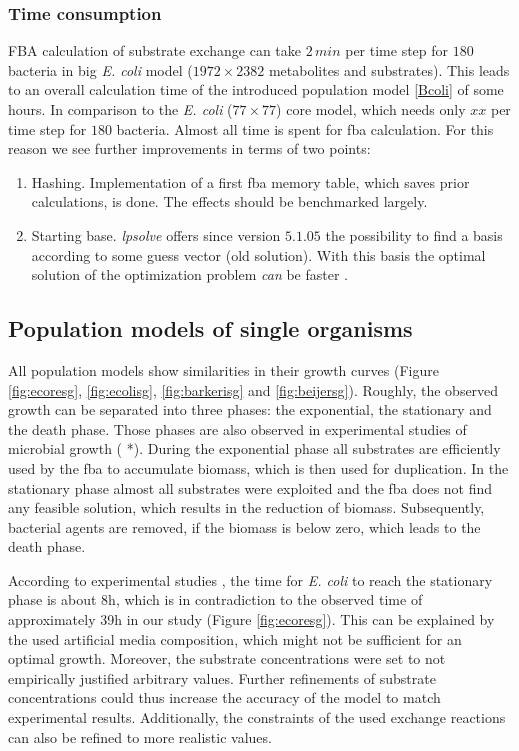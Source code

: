 \subsubsection{Time consumption}
FBA calculation of substrate exchange can take $2\,min$ per time step for $180$ bacteria in big \textit{E. coli} model ($1972\times 2382$ metabolites and substrates).
This leads to an overall calculation time of the introduced population model \ref{Bcoli} of some hours.
In comparison to the \textit{E. coli} ($77\times 77$) core model, which needs only $xx$ per time step for $180$ bacteria.
Almost all time is spent for fba calculation.
For this reason we see further improvements in terms of two points:
\begin{enumerate}
  \item Hashing. Implementation of a first fba memory table, which saves prior calculations, is done.
    The effects should be benchmarked largely.
  \item Starting base. \textit{lpsolve} offers since version $5.1.05$ the possibility to find a basis according to some guess vector (old solution).
    With this basis the optimal solution of the optimization problem \textit{can} be faster \cite{warmstart}.
\end{enumerate}

\subsection{Population models of single organisms}
All population models show similarities in their growth curves (Figure \hyperref[fig:ecoresg]{\ref{fig:ecoresg}}, \hyperref[fig:ecolisg]{\ref{fig:ecolisg}}, \hyperref[fig:barkerisg]{\ref{fig:barkerisg}} and \hyperref[fig:beijersg]{\ref{fig:beijersg}}).
Roughly, the observed growth can be separated into three phases: the exponential, the stationary and the death phase. Those phases are also observed in experimental studies of microbial growth ( *).
During the exponential phase all substrates are efficiently used by the fba to accumulate biomass, which is then used for duplication. In the stationary phase almost all substrates were exploited and the fba does not find any feasible solution, which results in the reduction of biomass. Subsequently, bacterial agents are removed, if the biomass is below zero, which leads to the death phase.

According to experimental studies \cite{Varma94}, the time for \emph{E. coli} to reach the stationary phase is about 8\;h, which is in contradiction to the observed time of approximately 39\;h in our study (Figure \hyperref[fig:ecoresg]{\ref{fig:ecoresg}}). This can be explained by the used artificial media composition, which might not be sufficient for an optimal growth.
Moreover, the substrate concentrations were set to not empirically justified arbitrary values. Further refinements of substrate concentrations could thus increase the accuracy of the model to match experimental results. Additionally, the constraints of the used exchange reactions can also be refined to more realistic values.

